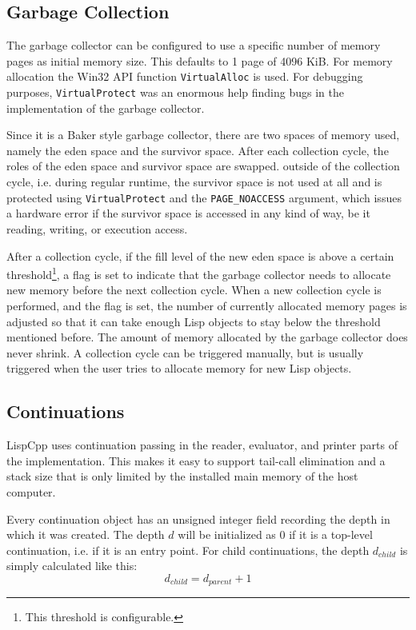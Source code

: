 \documentclass[a4paper]{scrartcl}
\newcommand{\lisp}{Lisp}
\begin{document}
\subsection{Garbage Collection}
\label{gc}
	The garbage collector can be configured to use a specific number of memory pages as initial memory size. This defaults to 1 page of 4096 KiB. For memory allocation the Win32 API function \lstinline|VirtualAlloc| is used. For debugging purposes, \lstinline|VirtualProtect| was an enormous help finding bugs in the implementation of the garbage collector.

	Since it is a Baker style garbage collector, there are two spaces of memory used, namely the eden space and the survivor space. After each collection cycle, the roles of the eden space and survivor space are swapped. outside of the collection cycle, i.e. during regular runtime, the survivor space is not used at all and is protected using \lstinline|VirtualProtect| and the \lstinline|PAGE_NOACCESS| argument, which issues a hardware error if the survivor space is accessed in any kind of way, be it reading, writing, or execution access.

	After a collection cycle, if the fill level of the new eden space is above a certain threshold\footnote{This threshold is configurable.}, a flag is set to indicate that the garbage collector needs to allocate new memory before the next collection cycle. When a new collection cycle is performed, and the flag is set, the number of currently allocated memory pages is adjusted so that it can take enough \lisp{} objects to stay below the threshold mentioned before. The amount of memory allocated by the garbage collector does never shrink. A collection cycle can be triggered manually, but is usually triggered when the user tries to allocate memory for new \lisp{} objects.

\subsection{Continuations}
\label{continuations}
	LispCpp uses continuation passing in the reader, evaluator, and printer parts of the implementation. This makes it easy to support tail-call elimination and a stack size that is only limited by the installed main memory of the host computer.

	Every continuation object has an unsigned integer field recording the depth in which it was created. The depth $d$ will be initialized as 0 if it is a top-level continuation, i.e. if it is an entry point. For child continuations, the depth $d_{child}$ is simply calculated like this: $$d_{child}=d_{parent}+1$$
\end{document}
